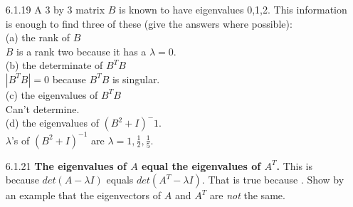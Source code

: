 \documentclass[10pt,twoside,reqno]{article}
\begin{document}
\begin{enumerate}
\vspace{3mm}
\item[6.1.19] A 3 by 3 matrix $B$ is known to have eigenvalues 0,1,2. This information is enough to find three of these (give the answers where possible): \\ \vspace{2mm}
{\addtolength{\leftskip}{10mm}
(a) the rank of $B$ \\ \vspace{2mm}
{\addtolength{\leftskip}{5mm}
$B$ is a rank two because it has a $\lambda=0$. \\
}
\vspace{3mm}
(b) the determinate of $B^TB$ \\ \vspace{2mm}
{\addtolength{\leftskip}{5mm}
$|B^TB|=0$ because $B^TB$ is singular. \\
}
\vspace{3mm}
(c) the eigenvalues of $B^TB$ \\ \vspace{2mm}
{\addtolength{\leftskip}{5mm}
Can't determine. \\
}
\vspace{3mm}
(d) the eigenvalues of $(B^2+I)^-1$. \\ \vspace{2mm}
{\addtolength{\leftskip}{5mm}
$\lambda$'s of $(B^2+I)^{-1}$ are $\lambda=1,\frac{1}{2},\frac{1}{5}$. \\
}
\vspace{3mm}
}
\item[6.1.21] \textbf{The eigenvalues of $A$ equal the eigenvalues of $A^T$.} This is because $det(A - \lambda I)$ equals $det(A^T - \lambda I)$. That is true because \underline{\hspace{10mm}}. Show by an example that the eigenvectors of $A$ and $A^T$ are \textit{not} the same.\\ \vspace{2mm}

\end{enumerate}
\end{document}
